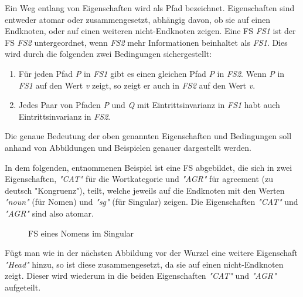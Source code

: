 \documentclass[12pt]{report}
\begin{document}
Ein Weg entlang von Eigenschaften wird als Pfad bezeichnet. Eigenschaften sind entweder atomar oder zusammengesetzt, abhängig davon, ob sie auf einen Endknoten, oder auf einen weiteren nicht-Endknoten zeigen.
Eine FS \textit{FS1} ist der FS \textit{FS2} untergeordnet, wenn \textit{FS2} mehr Informationen beinhaltet als \textit{FS1}. Dies wird durch die folgenden zwei Bedingungen sichergestellt:

\begin{enumerate}
\item Für jeden Pfad \textit{P} in \textit{FS1} gibt es einen gleichen Pfad \textit{P} in \textit{FS2}. Wenn \textit{P} in \textit{FS1} auf den Wert \textit{v} zeigt, so zeigt er auch in \textit{FS2} auf den Wert \textit{v}.
\item Jedes Paar von Pfaden \textit{P} und \textit{Q} mit Eintrittsinvarianz in \textit{FS1} habt auch Eintrittsinvarianz in \textit{FS2}.
\end{enumerate}

Die genaue Bedeutung der oben genannten Eigenschaften und Bedingungen soll anhand von Abbildungen und Beispielen genauer dargestellt werden. 

In dem folgenden, \cite{cop04} entnommenen Beispiel ist eine FS abgebildet, die sich in zwei Eigenschaften, \textit{"CAT"} für die Wortkategorie und \textit{"AGR"} für agreement (zu deutsch "Kongruenz"), teilt, welche jeweils auf die Endknoten mit den Werten \textit{"noun"} (für Nomen) und \textit{"sg"} (für Singular) zeigen. Die Eigenschaften \textit{"CAT"} und \textit{"AGR"} sind also atomar.

\begin{figure}[h!]
\begin{center}
\caption{FS eines Nomens im Singular \cite{cop04}}
\end{center}
\end{figure}

Fügt man wie in der nächsten Abbildung vor der Wurzel eine weitere Eigenschaft \textit{"Head"} hinzu, so ist diese zusammengesetzt, da sie auf einen nicht-Endknoten zeigt. Dieser wird wiederum in die beiden Eigenschaften \textit{"CAT"} und \textit{"AGR"} aufgeteilt. 
\end{document}
